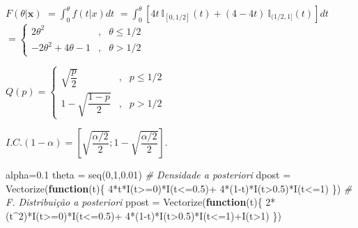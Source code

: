 \documentclass[
]{book}
\newenvironment{Shaded}{\begin{snugshade}}{\end{snugshade}}
\newcommand{\CommentTok}[1]{\textcolor[rgb]{0.56,0.35,0.01}{\textit{#1}}}
\newcommand{\ControlFlowTok}[1]{\textcolor[rgb]{0.13,0.29,0.53}{\textbf{#1}}}
\newcommand{\DecValTok}[1]{\textcolor[rgb]{0.00,0.00,0.81}{#1}}
\newcommand{\FloatTok}[1]{\textcolor[rgb]{0.00,0.00,0.81}{#1}}
\newcommand{\FunctionTok}[1]{\textcolor[rgb]{0.00,0.00,0.00}{#1}}
\newcommand{\NormalTok}[1]{#1}
\newcommand{\OtherTok}[1]{\textcolor[rgb]{0.56,0.35,0.01}{#1}}
\newcommand{\SpecialCharTok}[1]{\textcolor[rgb]{0.00,0.00,0.00}{#1}}
\begin{document}
\(F(\theta|\boldsymbol x)\) \(=\displaystyle \int_0^\theta f(t|x)dt\)
\(=\displaystyle \int_0^\theta\left[4t~\mathbb I_{[0,1/2]}(t)+(4-4t)~\mathbb I_{(1/2,1]}(t)\right]dt\)
\(=\left\{\begin{array}{lcc} 2\theta^2 &,& \theta\leq 1/2\\ -2\theta^2+4\theta-1 &,& \theta>1/2\end{array}\right.\)

\(Q(p)=\left\{\begin{array}{lcc} \sqrt{\dfrac{p}{2}} &,& p\leq 1/2\\ 1-\sqrt{\dfrac{1-p}{2}} &,& p>1/2\end{array}\right.\)

\(I.C.(1-\alpha)=\left[\sqrt{\dfrac{\alpha/2}{2}};1-\sqrt{\dfrac{\alpha/2}{2}}\right]\).

\begin{Shaded}
\begin{Highlighting}[]
\NormalTok{alpha}\OtherTok{=}\FloatTok{0.1}
\NormalTok{theta }\OtherTok{=} \FunctionTok{seq}\NormalTok{(}\DecValTok{0}\NormalTok{,}\DecValTok{1}\NormalTok{,}\FloatTok{0.01}\NormalTok{)}
\CommentTok{\# Densidade a posteriori}
\NormalTok{dpost }\OtherTok{=} \FunctionTok{Vectorize}\NormalTok{(}\ControlFlowTok{function}\NormalTok{(t)\{ }\DecValTok{4}\SpecialCharTok{*}\NormalTok{t}\SpecialCharTok{*}\FunctionTok{I}\NormalTok{(t}\SpecialCharTok{\textgreater{}=}\DecValTok{0}\NormalTok{)}\SpecialCharTok{*}\FunctionTok{I}\NormalTok{(t}\SpecialCharTok{\textless{}=}\FloatTok{0.5}\NormalTok{)}\SpecialCharTok{+}
    \DecValTok{4}\SpecialCharTok{*}\NormalTok{(}\DecValTok{1}\SpecialCharTok{{-}}\NormalTok{t)}\SpecialCharTok{*}\FunctionTok{I}\NormalTok{(t}\SpecialCharTok{\textgreater{}}\FloatTok{0.5}\NormalTok{)}\SpecialCharTok{*}\FunctionTok{I}\NormalTok{(t}\SpecialCharTok{\textless{}=}\DecValTok{1}\NormalTok{) \})}
\CommentTok{\# F. Distribuição a posteriori}
\NormalTok{ppost }\OtherTok{=} \FunctionTok{Vectorize}\NormalTok{(}\ControlFlowTok{function}\NormalTok{(t)\{ }\DecValTok{2}\SpecialCharTok{*}\NormalTok{(t}\SpecialCharTok{\^{}}\DecValTok{2}\NormalTok{)}\SpecialCharTok{*}\FunctionTok{I}\NormalTok{(t}\SpecialCharTok{\textgreater{}=}\DecValTok{0}\NormalTok{)}\SpecialCharTok{*}\FunctionTok{I}\NormalTok{(t}\SpecialCharTok{\textless{}=}\FloatTok{0.5}\NormalTok{)}\SpecialCharTok{+}
    \DecValTok{4}\SpecialCharTok{*}\NormalTok{(}\DecValTok{1}\SpecialCharTok{{-}}\NormalTok{t)}\SpecialCharTok{*}\FunctionTok{I}\NormalTok{(t}\SpecialCharTok{\textgreater{}}\FloatTok{0.5}\NormalTok{)}\SpecialCharTok{*}\FunctionTok{I}\NormalTok{(t}\SpecialCharTok{\textless{}=}\DecValTok{1}\NormalTok{)}\SpecialCharTok{+}\FunctionTok{I}\NormalTok{(t}\SpecialCharTok{\textgreater{}}\DecValTok{1}\NormalTok{) \})}

\end{Highlighting}
\end{Shaded}
\end{document}
